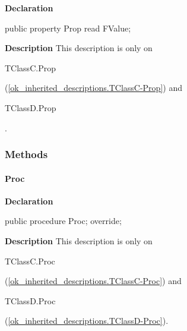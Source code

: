 \documentclass{report}
\begin{document}
\begin{list}{}{
\setlength{\itemindent}{0cm}
\setlength{\listparindent}{0cm}
\setlength{\leftmargin}{\evensidemargin}
\addtolength{\leftmargin}{\tmplength}
\settowidth{\labelsep}{X}
\addtolength{\leftmargin}{\labelsep}
\setlength{\labelwidth}{\tmplength}
}
\begin{flushleft}
\item[\textbf{Declaration}\hfill]
\begin{ttfamily}
public property Prop read FValue;\end{ttfamily}


\end{flushleft}
\par
\item[\textbf{Description}]
This description is only on \begin{ttfamily}TClassC.Prop\end{ttfamily}(\ref{ok_inherited_descriptions.TClassC-Prop}) and \begin{ttfamily}TClassD.Prop\end{ttfamily}.

\end{list}
\subsubsection*{\large{\textbf{Methods}}\normalsize\hspace{1ex}\hfill}
\paragraph*{Proc}\hspace*{\fill}

\begin{list}{}{
\setlength{\itemindent}{0cm}
\setlength{\listparindent}{0cm}
\setlength{\leftmargin}{\evensidemargin}
\addtolength{\leftmargin}{\tmplength}
\settowidth{\labelsep}{X}
\addtolength{\leftmargin}{\labelsep}
\setlength{\labelwidth}{\tmplength}
}
\begin{flushleft}
\item[\textbf{Declaration}\hfill]
\begin{ttfamily}
public procedure Proc; override;\end{ttfamily}


\end{flushleft}
\par
\item[\textbf{Description}]
This description is only on \begin{ttfamily}TClassC.Proc\end{ttfamily}(\ref{ok_inherited_descriptions.TClassC-Proc}) and \begin{ttfamily}TClassD.Proc\end{ttfamily}(\ref{ok_inherited_descriptions.TClassD-Proc}).

\end{list}
\end{document}
